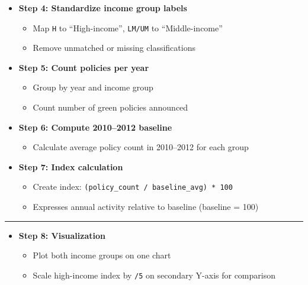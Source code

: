 \documentclass[
  letterpaper,
  DIV=11,
  numbers=noendperiod]{scrartcl}
\providecommand{\tightlist}{%
  \setlength{\itemsep}{0pt}\setlength{\parskip}{0pt}}
\begin{document}
\begin{itemize}
\tightlist
\item
  \textbf{Step 4: Standardize income group labels}

  \begin{itemize}
  \tightlist
  \item
    Map \texttt{H} to ``High-income'', \texttt{LM/UM} to
    ``Middle-income''\\
  \item
    Remove unmatched or missing classifications
  \end{itemize}
\item
  \textbf{Step 5: Count policies per year}

  \begin{itemize}
  \tightlist
  \item
    Group by year and income group\\
  \item
    Count number of green policies announced
  \end{itemize}
\item
  \textbf{Step 6: Compute 2010--2012 baseline}

  \begin{itemize}
  \tightlist
  \item
    Calculate average policy count in 2010--2012 for each group
  \end{itemize}
\item
  \textbf{Step 7: Index calculation}

  \begin{itemize}
  \tightlist
  \item
    Create index: \texttt{(policy\_count\ /\ baseline\_avg)\ *\ 100}\\
  \item
    Expresses annual activity relative to baseline (baseline = 100)
  \end{itemize}
\end{itemize}

\begin{center}\rule{0.5\linewidth}{0.5pt}\end{center}

\begin{itemize}
\tightlist
\item
  \textbf{Step 8: Visualization}

  \begin{itemize}
  \tightlist
  \item
    Plot both income groups on one chart\\
  \item
    Scale high-income index by \texttt{/5} on secondary Y-axis for
    comparison
  \end{itemize}
\end{itemize}
\end{document}
